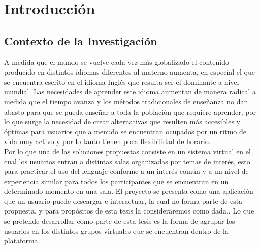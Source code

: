 \chapter{Introducción}
\label{chapter:chapter01}

\section{Contexto de la Investigación}
A medida que el mundo se vuelve cada vez más globalizado el contenido producido en distintos idiomas diferentes al materno aumenta, en especial el que se encuentra escrito en el idioma Inglés que resulta ser el dominante a nivel mundial. Las necesidades de aprender este idioma aumentan de manera radical a medida que el tiempo avanza y los métodos tradicionales de enseñanza no dan abasto para que se pueda enseñar a toda la población que requiere aprender, por lo que surge la necesidad de crear alternativas que resulten más accesibles y óptimas para usuarios que a menudo se encuentran ocupados por un ritmo de vida muy activo y por lo tanto tienen poca flexibilidad de horario.\\ 

Por lo que una de las soluciones propuestas consiste en  un sistema virtual en el cual los usuarios entran a distintas salas organizadas por temas de interés, esto para practicar el uso del lenguaje conforme a un interés común y a un nivel de experiencia similar para todos los participantes que se encuentran en un determinado momento en una sala. El proyecto se presenta como una aplicación que un usuario puede descargar e interactuar, la cual no forma parte de esta propuesta, y para propósitos de esta tesis la consideraremos como dada.. Lo que se pretende desarrollar como parte de esta tesis es la forma de agrupar  los usuarios en los distintos grupos virtuales que se encuentran dentro de la plataforma.\\ 

